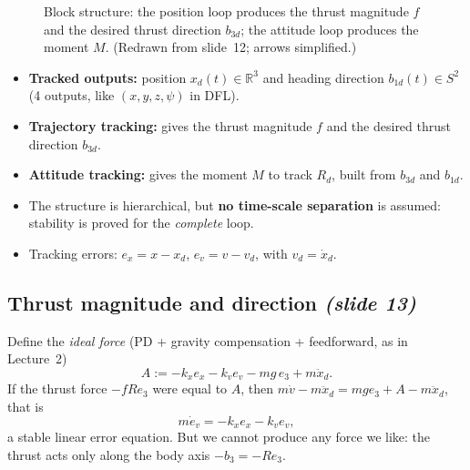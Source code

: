 \documentclass[11pt,a4paper]{article}
\newcommand{\R}{\mathbb{R}}
\newcommand{\ex}{e_x}
\newcommand{\ev}{e_v}
\newcommand{\sli}[1]{\emph{(#1)}}
\theoremstyle{definition}
\theoremstyle{plain}
\theoremstyle{remark}
\begin{document}
\begin{figure}[h]
\centering
{}
\caption{Block structure: the position loop produces the thrust magnitude $f$ and the desired thrust direction $b_{3d}$; the attitude loop produces the moment $M$. (Redrawn from slide~12; arrows simplified.)}
\end{figure}

\begin{itemize}
  \item \textbf{Tracked outputs:} position $x_d(t)\in\R^3$ and heading direction $b_{1d}(t)\in S^2$ (4 outputs, like $(x,y,z,\psi)$ in DFL).
  \item \textbf{Trajectory tracking:} gives the thrust magnitude $f$ and the desired thrust direction $b_{3d}$.
  \item \textbf{Attitude tracking:} gives the moment $M$ to track $R_d$, built from $b_{3d}$ and $b_{1d}$.
  \item The structure is hierarchical, but \textbf{no time-scale separation} is assumed: stability is proved for the \emph{complete} loop.
  \item Tracking errors: $\ex=x-x_d$, $\ev=v-v_d$, with $v_d=\dot x_d$.
\end{itemize}

\subsection{Thrust magnitude and direction \sli{slide 13}}

Define the \emph{ideal force} (PD + gravity compensation + feedforward, as in Lecture~2)
\[
A:=-k_x\ex-k_v\ev-mg\,e_3+m\ddot x_d .
\]
If the thrust force $-fRe_3$ were equal to $A$, then $m\dot v-m\ddot x_d=mge_3+A-m\ddot x_d$, that is
\[
m\dot e_v=-k_x\ex-k_v\ev ,
\]
a stable linear error equation. But we cannot produce any force we like: the thrust acts only along the body axis $-b_3=-Re_3$.
\end{document}
